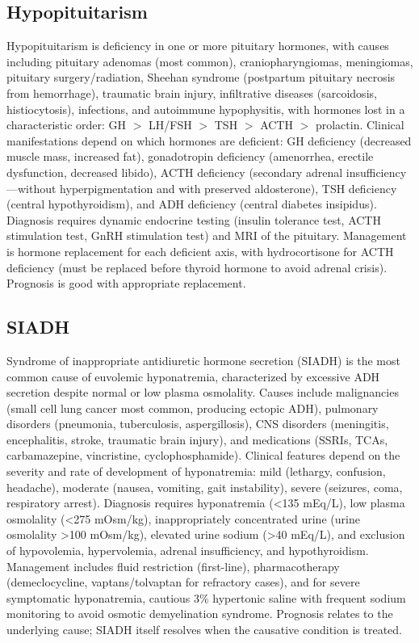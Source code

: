 \subsection{Hypopituitarism}
\label{sec:Hypopituitarism}
Hypopituitarism is deficiency in one or more pituitary hormones, with causes including pituitary adenomas (most common), craniopharyngiomas, meningiomas, pituitary surgery/radiation, Sheehan syndrome (postpartum pituitary necrosis from hemorrhage), traumatic brain injury, infiltrative diseases (sarcoidosis, histiocytosis), infections, and autoimmune hypophysitis, with hormones lost in a characteristic order: GH $>$ LH/FSH $>$ TSH $>$ ACTH $>$ prolactin. Clinical manifestations depend on which hormones are deficient: GH deficiency (decreased muscle mass, increased fat), gonadotropin deficiency (amenorrhea, erectile dysfunction, decreased libido), ACTH deficiency (secondary adrenal insufficiency---without hyperpigmentation and with preserved aldosterone), TSH deficiency (central hypothyroidism), and ADH deficiency (central diabetes insipidus). Diagnosis requires dynamic endocrine testing (insulin tolerance test, ACTH stimulation test, GnRH stimulation test) and MRI of the pituitary. Management is hormone replacement for each deficient axis, with hydrocortisone for ACTH deficiency (must be replaced before thyroid hormone to avoid adrenal crisis). Prognosis is good with appropriate replacement.

\subsection{SIADH}
\label{sec:SIADH}
Syndrome of inappropriate antidiuretic hormone secretion (SIADH) is the most common cause of euvolemic hyponatremia, characterized by excessive ADH secretion despite normal or low plasma osmolality. Causes include malignancies (small cell lung cancer most common, producing ectopic ADH), pulmonary disorders (pneumonia, tuberculosis, aspergillosis), CNS disorders (meningitis, encephalitis, stroke, traumatic brain injury), and medications (SSRIs, TCAs, carbamazepine, vincristine, cyclophosphamide). Clinical features depend on the severity and rate of development of hyponatremia: mild (lethargy, confusion, headache), moderate (nausea, vomiting, gait instability), severe (seizures, coma, respiratory arrest). Diagnosis requires hyponatremia (<135 mEq/L), low plasma osmolality (<275 mOsm/kg), inappropriately concentrated urine (urine osmolality >100 mOsm/kg), elevated urine sodium (>40 mEq/L), and exclusion of hypovolemia, hypervolemia, adrenal insufficiency, and hypothyroidism. Management includes fluid restriction (first-line), pharmacotherapy (demeclocycline, vaptans/tolvaptan for refractory cases), and for severe symptomatic hyponatremia, cautious 3\% hypertonic saline with frequent sodium monitoring to avoid osmotic demyelination syndrome. Prognosis relates to the underlying cause; SIADH itself resolves when the causative condition is treated.

